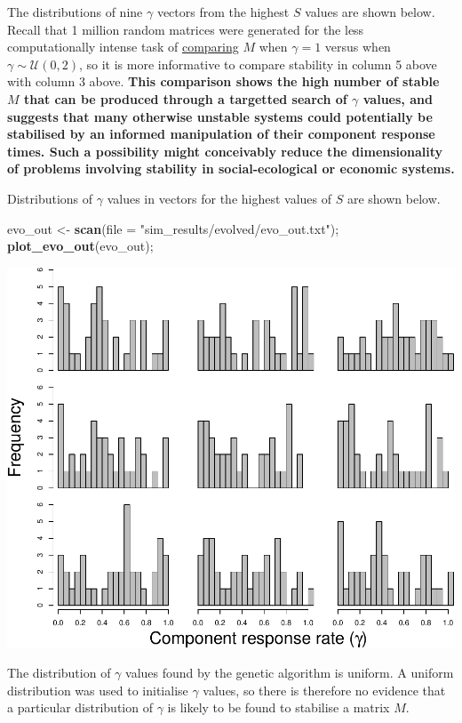 \documentclass[]{article}
\newenvironment{Shaded}{\begin{snugshade}}{\end{snugshade}}
\newcommand{\KeywordTok}[1]{\textcolor[rgb]{0.13,0.29,0.53}{\textbf{{#1}}}}
\newcommand{\DataTypeTok}[1]{\textcolor[rgb]{0.13,0.29,0.53}{{#1}}}
\newcommand{\StringTok}[1]{\textcolor[rgb]{0.31,0.60,0.02}{{#1}}}
\newcommand{\NormalTok}[1]{{#1}}
\begin{document}
The distributions of nine \(\gamma\) vectors from the highest \(S\)
values are shown below. Recall that 1 million random matrices were
generated for the less computationally intense task of
\protect\hyperlink{IncrS}{comparing} \(M\) when \(\gamma = 1\) versus
when \(\gamma \sim \mathcal{U}(0, 2)\), so it is more informative to
compare stability in column 5 above with column 3 above. \textbf{This
comparison shows the high number of stable \(M\) that can be produced
through a targetted search of \(\gamma\) values, and suggests that many
otherwise unstable systems could potentially be stabilised by an
informed manipulation of their component response times. Such a
possibility might conceivably reduce the dimensionality of problems
involving stability in social-ecological or economic systems.}

Distributions of \(\gamma\) values in vectors for the highest values of
\(S\) are shown below.

\begin{Shaded}
\begin{Highlighting}[]
\NormalTok{evo_out <-}\StringTok{ }\KeywordTok{scan}\NormalTok{(}\DataTypeTok{file =} \StringTok{"sim_results/evolved/evo_out.txt"}\NormalTok{);}
\KeywordTok{plot_evo_out}\NormalTok{(evo_out);}
\end{Highlighting}
\end{Shaded}

\includegraphics{SI_science_files/figure-latex/unnamed-chunk-32-1.pdf}

The distribution of \(\gamma\) values found by the genetic algorithm is
uniform. A uniform distribution was used to initialise \(\gamma\)
values, so there is therefore no evidence that a particular distribution
of \(\gamma\) is likely to be found to stabilise a matrix \(M\).
\end{document}
